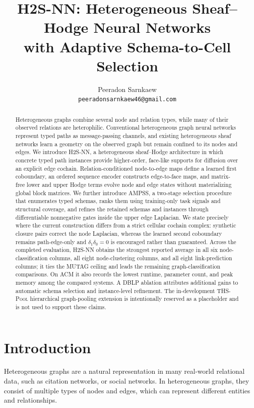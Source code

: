 \documentclass{article}
\title{H2S-NN: Heterogeneous Sheaf--Hodge Neural Networks\\
with Adaptive Schema-to-Cell Selection}
\author{
  Peeradon Sarnkaew \\
  \texttt{peeradonsarnkaew46@gmail.com}
}
\newcommand{\method}{\textsc{H2S-NN}}
\newcommand{\ampss}{\textsc{AMPSS}}
\newcommand{\thspool}{\textsc{THS-Pool}}
\begin{document}
\maketitle

\begin{abstract}
Heterogeneous graphs combine several node and relation types, while many of their observed
relations are heterophilic. Conventional heterogeneous graph neural networks represent typed
paths as message-passing channels, and existing heterogeneous sheaf networks learn a geometry on
the observed graph but remain confined to its nodes and edges. We introduce \method, a
heterogeneous sheaf--Hodge architecture in which concrete typed path instances provide
higher-order, face-like supports for diffusion over an explicit edge cochain. Relation-conditioned
node-to-edge maps define a learned first coboundary, an ordered sequence encoder constructs
edge-to-face maps, and matrix-free lower and upper Hodge terms evolve node and edge states without
materializing global block matrices. We further introduce \ampss, a two-stage selection procedure
that enumerates typed schemas, ranks them using training-only task signals and structural coverage,
and refines the retained schemas and instances through differentiable nonnegative gates inside the
upper edge Laplacian. We state precisely where the current construction differs from a strict
cellular cochain complex: synthetic closure pairs correct the node Laplacian, whereas the learned
second coboundary remains path-edge-only and $\delta_1\delta_0=0$ is encouraged rather than
guaranteed. Across the completed evaluation, \method{} obtains the strongest reported average in
all six node-classification columns, all eight node-clustering columns, and all eight
link-prediction columns; it ties the MUTAG ceiling and leads the remaining graph-classification
comparisons. On ACM it also records the lowest runtime, parameter count, and peak memory among the
compared systems. A DBLP ablation attributes additional gains to automatic schema selection and
instance-level refinement. The in-development \thspool{} hierarchical graph-pooling extension is
intentionally reserved as a placeholder and is not used to support these claims.
\end{abstract}

\section{Introduction}
\label{sec:introduction}

Heterogeneous graphs are a natural representation in many real-world relational data, such as citation networks, or social networks. 
In heterogeneous graphs, they consist of multiple types of nodes and edges, which can represent different entities and relationships.
\end{document}

